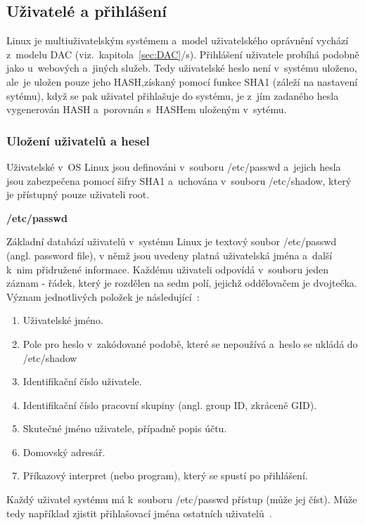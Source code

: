 \documentclass[a4paper,12pt]{article}
\newcommand{\odkazNaKapitolu}[1]{(viz.~kapitola~\ref{#1}/s\pageref{#1})}
\newcommand{\nadpis}[1]{%
	\vspace{4 mm}
	\textbf{#1}\\
	\vspace{4 mm}
	}
\begin{document}
\subsection{Uživatelé a přihlášení}

Linux je multiuživatelským systémem a~model uživatelského oprávnění vychází z~modelu DAC \odkazNaKapitolu{sec:DAC}. Přihlášení uživatele probíhá podobně jako u~webových a~jiných služeb. Tedy uživatelské heslo není v~systému uloženo, ale~je uložen pouze jeho HASH,získaný pomocí funkce SHA1 (záleží na nastavení sytému), když se pak uživatel přihlašuje do systému, je z~jím zadaného hesla vygenerován HASH a~porovnán s~HASHem uloženým v~sytému. 

\subsubsection{Uložení uživatelů a hesel}
Uživatelské v~OS Linux jsou definováni v~souboru /etc/passwd a~jejich hesla jsou zabezpečena pomocí šifry SHA1 a~uchována v~souboru /etc/shadow, který je přístupný pouze uživateli root. 

\nadpis{/etc/passwd}

Základní databází uživatelů v~systému Linux je textový soubor /etc/passwd (angl. password file), v němž jsou uvedeny platná uživatelská jména a~další k~nim přidružené informace. Každému uživateli odpovídá v~souboru jeden záznam - řádek, který je rozdělen na sedm polí, jejichž oddělovačem je dvojtečka. Význam jednotlivých položek je následující~\cite{LDP}:
\begin{enumerate}
 \item Uživatelské jméno.
 \item Pole pro heslo v~zakódované podobě, které se nepoužívá a~heslo se ukládá do /etc/shadow
 \item Identifikační číslo uživatele.
 \item Identifikační číslo pracovní skupiny (angl. group ID, zkráceně GID).
 \item Skutečné jméno uživatele, případně popis účtu.
 \item Domovský adresář.
 \item Příkazový interpret (nebo program), který se spustí po přihlášení.
\end{enumerate}

Každý uživatel systému má k~souboru /etc/passwd přístup (může jej číst). Může tedy například zjistit přihlašovací jména ostatních uživatelů~\cite{LDP}.\\
\end{document}
